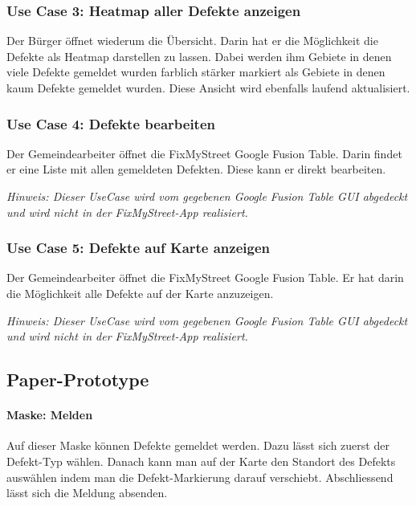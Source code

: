 \subsubsection{Use Case 3: Heatmap aller Defekte anzeigen}
Der Bürger öffnet wiederum die Übersicht. Darin hat er die Möglichkeit die Defekte als Heatmap darstellen zu lassen. Dabei werden ihm Gebiete in denen viele Defekte gemeldet wurden farblich stärker markiert als Gebiete in denen kaum Defekte gemeldet wurden. Diese Ansicht wird ebenfalls laufend aktualisiert. 

\subsubsection{Use Case 4: Defekte bearbeiten}
Der Gemeindearbeiter öffnet die FixMyStreet Google Fusion Table. Darin findet er eine Liste mit allen gemeldeten Defekten. Diese kann er direkt bearbeiten.

\emph{Hinweis: Dieser UseCase wird vom gegebenen Google Fusion Table GUI abgedeckt und wird nicht in der FixMyStreet-App realisiert.}

\subsubsection{Use Case 5: Defekte auf Karte anzeigen}
Der Gemeindearbeiter öffnet die FixMyStreet Google Fusion Table. Er hat darin die Möglichkeit alle Defekte auf der Karte anzuzeigen.

\emph{Hinweis: Dieser UseCase wird vom gegebenen Google Fusion Table GUI abgedeckt und wird nicht in der FixMyStreet-App realisiert.}

\subsection{Paper-Prototype}
\paragraph{Maske: Melden}
Auf dieser Maske können Defekte gemeldet werden. Dazu lässt sich zuerst der Defekt-Typ wählen. Danach kann man auf der Karte den Standort des Defekts auswählen indem man die Defekt-Markierung darauf verschiebt. Abschliessend lässt sich die Meldung absenden.

